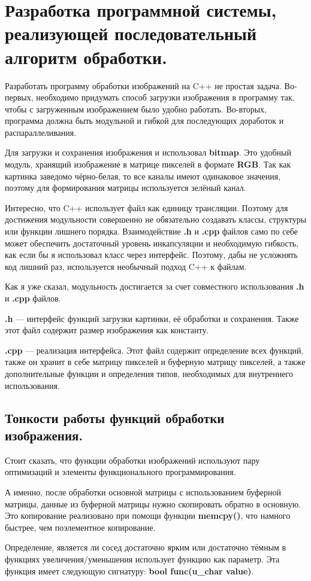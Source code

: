 \newpage


\section{Разработка программной системы, реализующей последовательный алгоритм обработки.}\label{sec:devprog}
Разработать программу обработки изображений на C++ не простая задача.
Во-первых, необходимо придумать способ загрузки изображения в программу так, чтобы с загруженным изображением было удобно работать.
Во-вторых, программа должна быть модульной и гибкой для последующих доработок и распараллеливания.

Для загрузки и сохранения изображения и использовал \textbf{bitmap}.
Это удобный модуль, хранящий изображение в матрице пикселей в формате \textbf{RGB}.
Так как картинка заведомо чёрно-белая, то все каналы имеют одинаковое значения, поэтому для формирования матрицы используется зелёный канал.

Интересно, что C++ использует файл как единицу трансляции.
Поэтому для достижения модульности совершенно не обязательно создавать классы, структуры или функции лишнего порядка.
Взаимодействие \textbf{.h} и \textbf{.cpp} файлов само по себе может обеспечить достаточный уровень инкапсуляции и необходимую гибкость, как если бы я использовал класс через интерфейс.
Поэтому, дабы не усложнять код лишний раз, используется необычный подход C++ к файлам.

Как я уже сказал, модульность достигается за счет совместного использования \textbf{.h} и \textbf{.cpp} файлов.

\textbf{.h} --- интерфейс функций загрузки картинки, её обработки и сохранения.
Также этот файл содержит размер изображения как константу.

\textbf{.cpp} --- реализация интерфейса.
Этот файл содержит определение всех функций, также он хранит в себе матрицу пикселей и буферную матрицу пикселей, а также дополнительные функции и определения типов, необходимых для внутреннего использования.

\subsection{Тонкости работы функций обработки изображения.}\label{subsec:imageprocessingPickUpOn}
Стоит сказать, что функции обработки изображений используют пару оптимизаций и элементы функционального программирования.

А именно, после обработки основной матрицы с использованием буферной матрицы, данные из буферной матрицы нужно скопировать обратно в основную.
Это копирование реализовано при помощи функции \textbf{memcpy()}, что намного быстрее, чем поэлементное копирование.

Определение, является ли сосед достаточно ярким или достаточно тёмным в функциях увеличения/уменьшения использует функцию как параметр.
Эта функция имеет следующую сигнатуру: \textbf{bool func(u\_char value)}.
